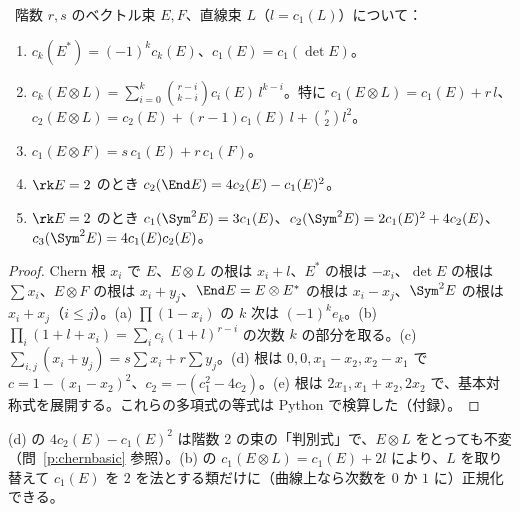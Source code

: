 \begin{thm}\label{thm:chernops}\tP\ 階数 $r,s$ のベクトル束 $E,F$、直線束 $L$（$l=c_1(L)$）について：
\begin{enumerate}[label=(\alph*)]
\item $c_k(E^*)=(-1)^kc_k(E)$、$c_1(E)=c_1(\det E)$。
\item $c_k(E\otimes L)=\sum_{i=0}^k\binom{r-i}{k-i}c_i(E)\,l^{k-i}$。特に $c_1(E\otimes L)=c_1(E)+r\,l$、$c_2(E\otimes L)=c_2(E)+(r-1)c_1(E)\,l+\binom r2l^2$。
\item $c_1(E\otimes F)=s\,c_1(E)+r\,c_1(F)$。
\item $\rk E=2$ のとき $c_2(\End E)=4c_2(E)-c_1(E)^2$。
\item $\rk E=2$ のとき $c_1(\Sym^2E)=3c_1(E)$、$c_2(\Sym^2E)=2c_1(E)^2+4c_2(E)$、$c_3(\Sym^2E)=4c_1(E)c_2(E)$。
\end{enumerate}
\end{thm}
\begin{proof}
Chern 根 $x_i$ で $E$、$E\otimes L$ の根は $x_i+l$、$E^*$ の根は $-x_i$、$\det E$ の根は $\sum x_i$、$E\otimes F$ の根は $x_i+y_j$、$\End E=E\otimes E^*$ の根は $x_i-x_j$、$\Sym^2E$ の根は $x_i+x_j$（$i\le j$）。(a) $\prod(1-x_i)$ の $k$ 次は $(-1)^ke_k$。(b) $\prod_i(1+l+x_i)=\sum_ic_i(1+l)^{r-i}$ の次数 $k$ の部分を取る。(c) $\sum_{i,j}(x_i+y_j)=s\sum x_i+r\sum y_j$。(d) 根は $0,0,x_1-x_2,x_2-x_1$ で $c=1-(x_1-x_2)^2$、$c_2=-(c_1^2-4c_2)$。(e) 根は $2x_1,x_1+x_2,2x_2$ で、基本対称式を展開する。これらの多項式の等式は Python で検算した（付録）。
\end{proof}
\begin{rem}
(d) の $4c_2(E)-c_1(E)^2$ は階数 2 の束の「判別式」で、$E\otimes L$ をとっても不変（問~\ref{p:chernbasic} 参照）。(b) の $c_1(E\otimes L)=c_1(E)+2l$ により、$L$ を取り替えて $c_1(E)$ を $2$ を法とする類だけに（曲線上なら次数を $0$ か $1$ に）正規化できる。
\end{rem}

